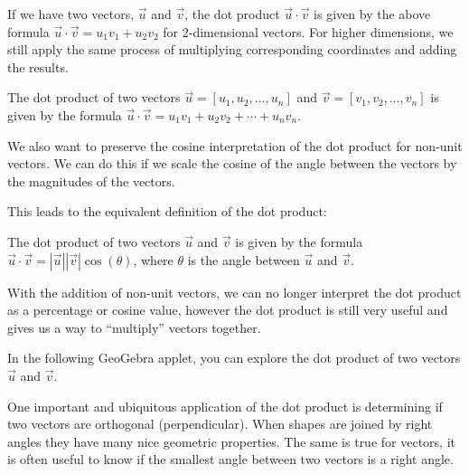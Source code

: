 \documentclass{ximera}
\begin{document}
If we have two vectors, $\vec u$ and $\vec v$, the dot product $\vec u\cdot\vec v$ is given by the above formula $\vec u\cdot\vec v=u_1v_1+u_2v_2$ for 2-dimensional vectors. For higher dimensions, we still apply the same process of multiplying corresponding coordinates and adding the results.

\begin{definition}
The dot product of two vectors $\vec{u}=[u_1,u_2,\ldots,u_n]$ and $\vec{v}=[v_1,v_2,\ldots,v_n]$ is given by the formula $\vec{u}\cdot\vec{v}=u_1v_1+u_2v_2+\cdots+u_nv_n$.
\end{definition}

We also want to preserve the cosine interpretation of the dot product for non-unit vectors. We can do this if we scale the cosine of the angle between the vectors by the magnitudes of the vectors. 

This leads to the equivalent definition of the dot product:

\begin{definition}
The dot product of two vectors $\vec{u}$ and $\vec{v}$ is given by the formula $\vec{u}\cdot\vec{v}=|\vec{u}||\vec{v}|\cos(\theta)$, where $\theta$ is the angle between $\vec{u}$ and $\vec{v}$.
\end{definition}

With the addition of non-unit vectors, we can no longer interpret the dot product as a percentage or cosine value, however the dot product is still very useful and gives us a way to ``multiply'' vectors together.

In the following GeoGebra applet, you can explore the dot product of two vectors $\vec u$ and $\vec v$.

\begin{center}
\end{center}

One important and ubiquitous application of the dot product is determining if two vectors are orthogonal (perpendicular). When shapes are joined by right angles they have many nice geometric properties. The same is true for vectors, it is often useful to know if the smallest angle between two vectors is a right angle.
\end{document}
